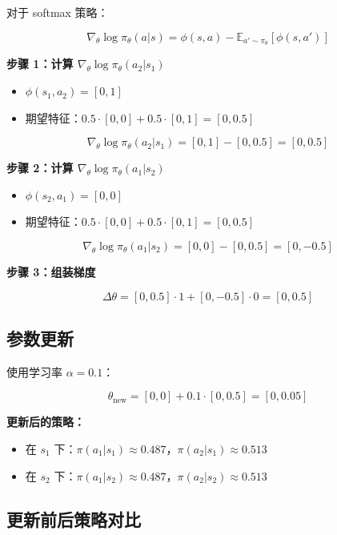 \documentclass[12pt,a4paper]{article}
\newcommand{\E}{\mathbb{E}}
\newcommand{\grad}{\nabla}
\theoremstyle{noteplain}
\theoremstyle{noteexercise}
\begin{document}
对于 softmax 策略：

\begin{equation}\label{eq:grad-softmax}
  \grad_\theta \log \pi_\theta(a|s) = \phi(s,a) - \E_{a'\sim\pi_\theta}[\phi(s,a')]
\end{equation}

\textbf{步骤 1：计算 $\grad_\theta \log \pi_\theta(a_2|s_1)$}

\begin{itemize}
  \setlength{\itemsep}{0.2em}
  \item $\phi(s_1,a_2) = [0,1]$
  \item 期望特征：$0.5\cdot[0,0] + 0.5\cdot[0,1] = [0,0.5]$
\end{itemize}

\[
\grad_\theta \log \pi_\theta(a_2|s_1) = [0,1] - [0,0.5] = [0,0.5]
\]

\textbf{步骤 2：计算 $\grad_\theta \log \pi_\theta(a_1|s_2)$}

\begin{itemize}
  \setlength{\itemsep}{0.2em}
  \item $\phi(s_2,a_1) = [0,0]$
  \item 期望特征：$0.5\cdot[0,0] + 0.5\cdot[0,1] = [0,0.5]$
\end{itemize}

\[
\grad_\theta \log \pi_\theta(a_1|s_2) = [0,0] - [0,0.5] = [0,-0.5]
\]

\textbf{步骤 3：组装梯度}

\[
\Delta\theta = [0,0.5]\cdot 1 + [0,-0.5]\cdot 0 = [0,0.5]
\]

\subsection{参数更新}\label{ssec:param-update}

使用学习率 $\alpha = 0.1$：

\[
\theta_{\text{new}} = [0,0] + 0.1\cdot[0,0.5] = [0,0.05]
\]

\textbf{更新后的策略：}

\begin{itemize}
  \setlength{\itemsep}{0.2em}
  \item 在 $s_1$ 下：$\pi(a_1|s_1) \approx 0.487$，$\pi(a_2|s_1) \approx 0.513$
  \item 在 $s_2$ 下：$\pi(a_1|s_2) \approx 0.487$，$\pi(a_2|s_2) \approx 0.513$
\end{itemize}

\subsection{更新前后策略对比}\label{ssec:compare}
\end{document}
